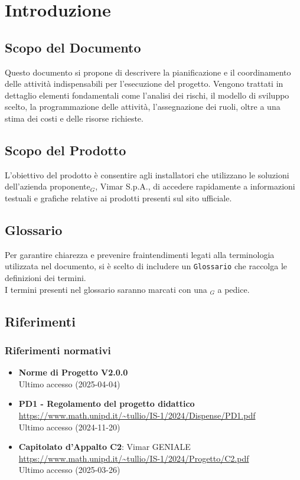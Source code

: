 \section{Introduzione}
\subsection{Scopo del Documento}
Questo documento si propone di descrivere la pianificazione e il coordinamento delle attività indispensabili per l'esecuzione del progetto. Vengono trattati in dettaglio elementi fondamentali come l'analisi dei rischi, il modello di sviluppo scelto, la programmazione delle attività, l'assegnazione dei ruoli, oltre a una stima dei costi e delle risorse richieste.
\subsection{Scopo del Prodotto} 
L'obiettivo del prodotto è consentire agli installatori che utilizzano le soluzioni dell'azienda proponente$_G$, Vimar S.p.A., di accedere rapidamente a informazioni testuali e grafiche relative ai prodotti presenti sul sito ufficiale.
\subsection{Glossario}
Per garantire chiarezza e prevenire fraintendimenti legati alla terminologia utilizzata nel documento, si è scelto di includere un \texttt{Glossario} che raccolga le definizioni dei termini.\\ I termini presenti nel glossario saranno marcati con una $_G$ a pedice.
\subsection{Riferimenti}
\subsubsection{Riferimenti  normativi}  
\begin{itemize}
    \item \textbf{Norme di Progetto V2.0.0}\\
        Ultimo accesso (2025-04-04)
    \item \textbf{PD1 - Regolamento del progetto didattico} \\
    \url{https://www.math.unipd.it/~tullio/IS-1/2024/Dispense/PD1.pdf} \\
        Ultimo accesso (2024-11-20)
    \item \textbf{Capitolato d'Appalto C2}: Vimar GENIALE \\
    \url{https://www.math.unipd.it/~tullio/IS-1/2024/Progetto/C2.pdf}\\
        Ultimo accesso (2025-03-26)
\end{itemize}
